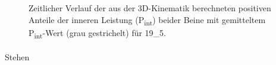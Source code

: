 \documentclass[
  letterpaper,
  DIV=11]{scrartcl}
\makeatletter
\let\oldparagraph\paragraph
\renewcommand{\paragraph}{
    \@ifstar
      \xxxParagraphStar
      \xxxParagraphNoStar
  }
\newcommand{\xxxParagraphStar}[1]{\oldparagraph*{#1}\mbox{}}
\newcommand{\xxxParagraphNoStar}[1]{\oldparagraph{#1}\mbox{}}
\makeatother
\begin{document}
\begin{figure}


\caption{\label{fig-PInt_Kinematik_19_5}Zeitlicher Verlauf der aus der
3D-Kinematik berechneten positiven Anteile der inneren Leistung
(P\textsubscript{int}) beider Beine mit gemitteltem
P\textsubscript{int}-Wert (grau gestrichelt) für 19\_5.}

\end{figure}%

\paragraph{Stehen}
\end{document}
